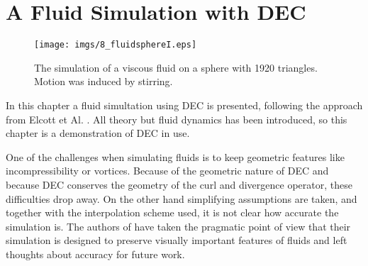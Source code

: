 \chapter{A Fluid Simulation with DEC}
\label{chap:FS}

\begin{figure}[h]%
\begin{center}
\texttt{[image: imgs/8\_fluidsphereI.eps]}%
\end{center}
\caption{The simulation of a viscous fluid on a sphere with 1920 triangles. Motion was induced by stirring.}%
\label{fig:8_fluidsphere}%
\end{figure}

In this chapter a fluid simultation using DEC is presented, following the approach from Elcott et Al. \cite{simplicialFluids}. 
All theory but fluid dynamics has been introduced, so this chapter is a demonstration of DEC in use. 

One of the challenges when simulating fluids is to keep geometric features like incompressibility or vortices. Because of the geometric nature of DEC and because DEC conserves the geometry of the curl and divergence operator, these difficulties drop away. On the other hand simplifying assumptions are taken, and together with the interpolation scheme used, it is not clear how accurate the simulation is. The authors of \cite{simplicialFluids} have taken the pragmatic point of view that their simulation is designed to preserve visually important features of fluids and left thoughts about accuracy for future work. 

